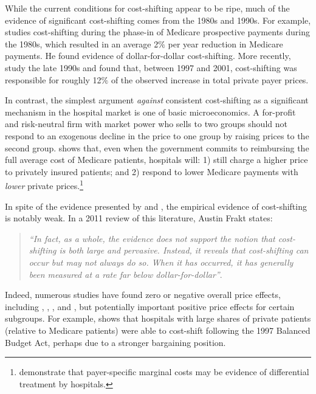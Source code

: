 \documentclass[12pt]{article}
\begin{document}
While the current conditions for cost-shifting appear to be ripe, much of the evidence of significant cost-shifting comes from the 1980s and 1990s.  For example, \cite{cutler1998costshift} studies cost-shifting during the phase-in of Medicare prospective payments during the 1980s, which resulted in an average 2$\%$ per year reduction in Medicare payments.  He found evidence of dollar-for-dollar cost-shifting.  More recently, \cite{zwanziger2006} study the late 1990s and found that, between 1997 and 2001, cost-shifting was responsible for roughly 12$\%$ of the observed increase in total private payer prices.

In contrast, the simplest argument \textit{against} consistent cost-shifting as a significant mechanism in the hospital market is one of basic microeconomics.  A for-profit and risk-neutral firm with market power who sells to two groups should not respond to an exogenous decline in the price to one group by raising prices to the second group.  \cite{hay1983} shows that, even when the government commits to reimbursing the full average cost of Medicare patients, hospitals will: 1) still charge a higher price to privately insured patients; and 2) respond to lower Medicare payments with \textit{lower} private prices.\footnote{\cite{dor1996} demonstrate that payer-specific marginal costs may be evidence of differential treatment by hospitals.}

In spite of the evidence presented by \cite{cutler1998costshift} and \cite{zwanziger2006}, the empirical evidence of cost-shifting is notably weak.  In a 2011 review of this literature, Austin Frakt states:
\begin{quote}
\textit{``In fact, as a whole, the evidence does not support the notion that cost-shifting is both large and pervasive. Instead, it reveals that cost-shifting can occur but may not always do so. When it has occurred, it has generally been measured at a rate far below dollar-for-dollar''}.
\end{quote}

Indeed, numerous studies have found zero or negative overall price effects, including \cite{dranove2008impact}, \cite{wu2010}, \cite{frakt2014}, and \cite{dranove2017}, but potentially important positive price effects for certain subgroups. For example, \cite{wu2010} shows that hospitals with large shares of private patients (relative to Medicare patients) were able to cost-shift following the 1997 Balanced Budget Act, perhaps due to a stronger bargaining position.
\end{document}
